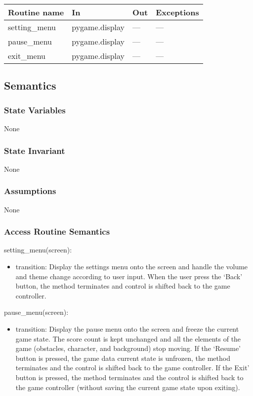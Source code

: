 \documentclass[12pt]{article}
\begin{document}
\begin{tabular}{| l | l | l | l |}
\hline
\textbf{Routine name} & \textbf{In} & \textbf{Out} & \textbf{Exceptions}\\
\hline
    setting\_menu & pygame.display & --- & ---\\
\hline
    pause\_menu & pygame.display & --- & ---\\
\hline
    exit\_menu & pygame.display & --- & ---\\
\hline
\end{tabular}

\subsection* {Semantics}

\subsubsection* {State Variables}

None

\subsubsection* {State Invariant}

None

\subsubsection* {Assumptions}

None

\subsubsection* {Access Routine Semantics}
\noindent setting\_menu(screen):
\begin{itemize}
    \item transition: Display the settings menu onto the screen and handle the volume and theme change according to user input. When the user press the `Back' button, the method terminates and control is shifted back to the game controller.
\end{itemize}

\noindent pause\_menu(screen):
\begin{itemize}
    \item transition: Display the pause menu onto the screen and freeze the current game state. The score count is kept unchanged and all the elements of the game (obstacles, character, and background) stop moving. If the `Resume' button is pressed, the game data current state is unfrozen, the method terminates and the control is shifted back to the game controller. If the Exit' button is pressed, the method terminates and the control is shifted back to the game controller (without saving the current game state upon exiting).
\end{itemize}
\end{document}

